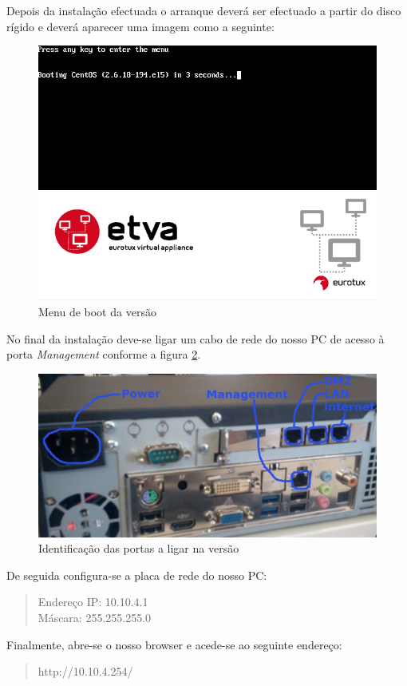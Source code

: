 Depois da instalação efectuada o arranque deverá ser efectuado a partir do disco rígido e deverá aparecer uma imagem como a seguinte:

\begin{figure}[H]
	\begin{center}
	\includegraphics[scale=0.5]{screenshots/install_etva11.png}
	\caption{Menu de boot da versão \acronym}
	\label{fig:boot_screen_standard}
	\end{center}
\end{figure}

No final da instalação deve-se ligar um cabo de rede do nosso PC de acesso à porta \emph{Management} conforme a figura \ref{fig:back_standard}.

\begin{figure}[H]
	\begin{center}
	\includegraphics[scale=0.12]{screenshots/appliance_back_identifica.jpg}
	\caption{Identificação das portas a ligar na versão \acronym}
	\label{fig:back_standard}
	\end{center}
\end{figure}

De seguida configura-se a placa de rede do nosso PC:

\begin{quote}
Endereço IP: 10.10.4.1\\
Máscara: 255.255.255.0
\end{quote}

Finalmente, abre-se o nosso browser e acede-se ao seguinte endereço:
\begin{quote}
http://10.10.4.254/
\end{quote}

\pagebreak

